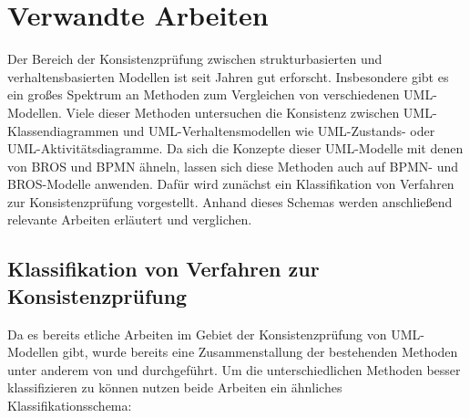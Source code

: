 \chapter{Verwandte Arbeiten}

Der Bereich der Konsistenzprüfung zwischen strukturbasierten und verhaltensbasierten Modellen ist seit Jahren gut erforscht.
Insbesondere gibt es ein großes Spektrum an Methoden zum Vergleichen von verschiedenen UML-Modellen.
Viele dieser Methoden untersuchen die Konsistenz zwischen UML-Klassendiagrammen und UML-Verhaltensmodellen wie UML-Zustands- oder UML-Aktivitätsdiagramme.
Da sich die Konzepte dieser UML-Modelle mit denen von BROS und BPMN ähneln, lassen sich diese Methoden auch auf BPMN- und BROS-Modelle anwenden.
Dafür wird zunächst ein Klassifikation von Verfahren zur Konsistenzprüfung vorgestellt.
Anhand dieses Schemas werden anschließend relevante Arbeiten erläutert und verglichen.

\section{Klassifikation von Verfahren zur Konsistenzprüfung}

Da es bereits etliche Arbeiten im Gebiet der Konsistenzprüfung von UML-Modellen gibt, wurde bereits eine Zusammenstallung der bestehenden Methoden unter anderem von \cite{Usman2008} und \cite{Lucas2009} durchgeführt.
Um die unterschiedlichen Methoden besser klassifizieren zu können nutzen beide Arbeiten ein ähnliches Klassifikationsschema:


